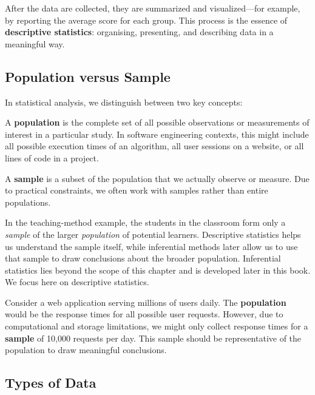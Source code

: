 After the data are collected, they are summarized and visualized—for example, by reporting the average score for each group. This process is the essence of \textbf{descriptive statistics}: organising, presenting, and describing data in a meaningful way.

\subsection*{Population versus Sample}

In statistical analysis, we distinguish between two key concepts:

\begin{definition}[Population]
A \textbf{population} is the complete set of all possible observations or measurements of interest in a particular study. In software engineering contexts, this might include all possible execution times of an algorithm, all user sessions on a website, or all lines of code in a project.
\end{definition}

\begin{definition}[Sample]
A \textbf{sample} is a subset of the population that we actually observe or measure. Due to practical constraints, we often work with samples rather than entire populations.
\end{definition}

In the teaching-method example, the students in the classroom form only a \emph{sample} of the larger \emph{population} of potential learners. Descriptive statistics helps us understand the sample itself, while inferential methods later allow us to use that sample to draw conclusions about the broader population. Inferential statistics lies beyond the scope of this chapter and is developed later in this book. We focus here on descriptive statistics.


\begin{example}\par

Consider a web application serving millions of users daily. The \textbf{population} would be the response times for all possible user requests. However, due to computational and storage limitations, we might only collect response times for a \textbf{sample} of 10,000 requests per day. This sample should be representative of the population to draw meaningful conclusions.
\end{example}

\subsection*{Types of Data}

